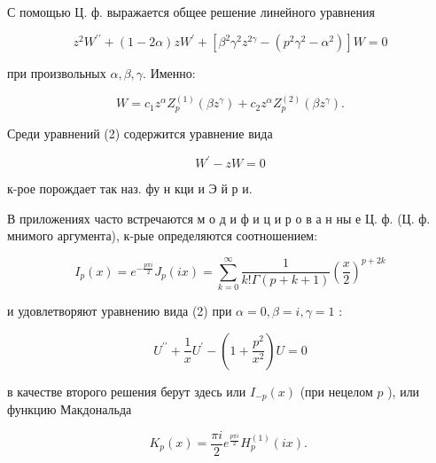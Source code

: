 \documentclass[10pt]{article}
\begin{document}
С помощью Ц. ф. выражается общее решение линейного уравнения



\[

z^{2} W^{\prime \prime}+(1-2 \alpha) z W^{\prime}+\left[\beta^{2} \gamma^{2} z^{2 \gamma}-\left(p^{2} \gamma^{2}-\alpha^{2}\right)\right] W=0

\]



при произвольных $\alpha, \beta, \gamma$. Именно:



\[

W=c_{1} z^{\alpha} Z_{p}^{(1)}\left(\beta z^{\gamma}\right)+c_{2} z^{\alpha} Z_{p}^{(2)}\left(\beta z^{\gamma}\right) .

\]



Среди уравнений (2) содержится уравнение вида



\[

W^{\prime}-z W=0

\]



к-рое порождает так наз. фу н кци и Э й р и.



В приложениях часто встречаются м о д и ф и ц и р о в а н ны е Ц. ф. (Ц. ф. мнимого аргумента), к-рые определяются соотношением:



\[

I_{p}(x)=e^{-\frac{p \pi i}{2}} J_{p}(i x)=\sum_{k=0}^{\infty} \frac{1}{k ! \Gamma(p+k+1)}\left(\frac{x}{2}\right)^{p+2 k}

\]



и удовлетворяют уравнению вида (2) при $\alpha=0, \beta=i, \gamma=1$ :



\[

U^{\prime \prime}+\frac{1}{x} U^{\prime}-\left(1+\frac{p^{2}}{x^{2}}\right) U=0

\]



в качестве второго решения берут здесь или $I_{-p}(x)$ (при нецелом $p$ ), или функцию Макдональда



\[

K_{p}(x)=\frac{\pi i}{2} e^{\frac{p \pi i}{2}} H_{p}^{(1)}(i x) \text {. }

\]
\end{document}

